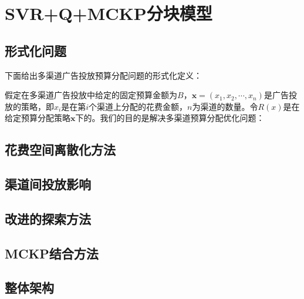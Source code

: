 \section{SVR+Q+MCKP分块模型}
\subsection{形式化问题}
下面给出多渠道广告投放预算分配问题的形式化定义：

假定在多渠道广告投放中给定的固定预算金额为$B$，$\bm{x}=(x_{1},x_{2},\cdots,x_{n})$是广告投放的策略，即$x_{i}$是在第$i$个渠道上分配的花费金额，$n$为渠道的数量。令$R(x)$是在给定预算分配策略$\bm{x}$下的。我们的目的是解决多渠道预算分配优化问题：

\subsection{花费空间离散化方法}
\subsection{渠道间投放影响}
\subsection{改进的探索方法}
\subsection{MCKP结合方法}
\subsection{整体架构}